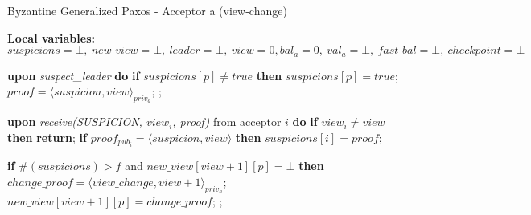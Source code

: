 \begin{algorithm} 
	\caption{Byzantine Generalized Paxos - Acceptor a (view-change)}
	\label{BFT-Proc}
	\textbf{Local variables:} $suspicions = \bot,\ new\_view = \bot,\ leader = \bot,\ view = 0, bal_a = 0,\ val_a = \bot,\ fast\_bal = \bot,\ checkpoint=\bot$
	\begin{algorithmic}[1]		
		\State \textbf{upon} \textit{suspect\_leader} \textbf{do} 
		\State\hspace{\algorithmicindent} \textbf{if} $suspicions[p] \neq true$ \textbf{then}
		\State\hspace{\algorithmicindent}\hspace{\algorithmicindent} $suspicions[p] = true$;
		\State\hspace{\algorithmicindent}\hspace{\algorithmicindent} $proof = \langle suspicion, view \rangle_{priv_a}$;
		\State \hspace{\algorithmicindent}\hspace{\algorithmicindent} ;	
		\State
		
		\State \textbf{upon} \textit{receive(SUSPICION, $view_i$, proof)} from acceptor $i$ \textbf{do} 
		\State\hspace{\algorithmicindent} \textbf{if} $view_i \neq view$ \textbf{then}
		\State\hspace{\algorithmicindent}\hspace{\algorithmicindent} \textbf{return};
		\State\hspace{\algorithmicindent} \textbf{if} $proof_{pub_i} = \langle suspicion, view \rangle$ \textbf{then}
		\State\hspace{\algorithmicindent}\hspace{\algorithmicindent} $suspicions[i] = proof$;
		
		\State\hspace{\algorithmicindent} \textbf{if} $\#(suspicions) > f$ and $new\_view[view+1][p] = \bot$ \textbf{then}
		\State\hspace{\algorithmicindent}\hspace{\algorithmicindent} $change\_proof = \langle view\_change, view +1 \rangle_{priv_a}$;
		\State\hspace{\algorithmicindent}\hspace{\algorithmicindent} $new\_view[view+1][p] = change\_proof$;
		\State\hspace{\algorithmicindent}\hspace{\algorithmicindent} ;
		\State
		

\end{algorithmic}
\end{algorithm}
